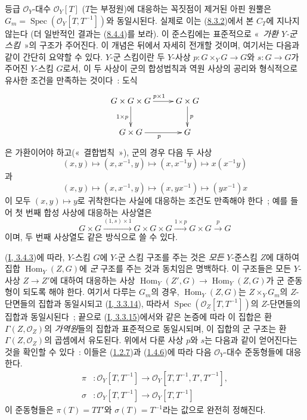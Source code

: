 \begin{remark}[8.3.9]
\label{II.8.3.9-ko}
등급 $\mathcal{O}_Y$-대수 $\mathcal{O}_Y[T]$ ($T$는 부정원)에 대응하는
꼭짓점이 제거된 아핀 원뿔은
$G_m=\operatorname{Spec}(\mathcal{O}_Y[T,T^{-1}])$와 동일시된다. 실제로
이는 (\hyperref[II.8.3.2-ko]{8.3.2})에서 본 $C_T$에 지나지 않는다
(더 일반적인 결과는 (\hyperref[II.8.4.4-ko]{8.4.4})를 보라). 이
준스킴에는 표준적으로 «~\emph{가환 $Y$-군 스킴}~»의 구조가 주어진다.
이 개념은 뒤에서 자세히 전개할 것이며, 여기서는 다음과 같이 간단히
요약할 수 있다. $Y$-군 스킴이란 두 $Y$-사상
$p:G\times_YG\to G$와 $s:G\to G$가 주어진 $Y$-스킴 $G$로서, 이 두
사상이 군의 합성법칙과 역원 사상의 공리와 형식적으로 유사한 조건을
만족하는 것이다~: 도식
\[
  \xymatrix{
    G\times G\times G \ar[r]^{p\times1}\ar[d]_{1\times p}
      & G\times G \ar[d]^{p} \\
    G\times G \ar[r]_{p} & G
  }
\]
은 가환이어야 하고(«~결합법칙~»), 군의 경우 다음 두 사상
\[
  (x,y)\mapsto(x,x^{-1},y)\mapsto(x,x^{-1}y)\mapsto x(x^{-1}y)
\]
과
\[
  (x,y)\mapsto(x,x^{-1},y)\mapsto(x,yx^{-1})\mapsto(yx^{-1})x
\]
이 모두 $(x,y)\mapsto y$로 귀착한다는 사실에 대응하는 조건도
만족해야 한다~; 예를 들어 첫 번째 합성 사상에 대응하는 사상열은
\[
  G\times G\xrightarrow{(1,s)\times1}G\times G\times G
  \xrightarrow{1\times p}G\times G\xrightarrow{p}G
\]
이며, 두 번째 사상열도 같은 방식으로 쓸 수 있다.

(\hyperref[I.3.4.3-ko]{I, 3.4.3})에 따라, $Y$-스킴 $G$에 $Y$-군 스킴
구조를 주는 것은 \emph{모든} $Y$-준스킴 $Z$에 대하여 집합
$\operatorname{Hom}_Y(Z,G)$에 \emph{군} 구조를 주는 것과 동치임은
명백하다. 이 구조들은 모든 $Y$-사상 $Z\to Z'$에 대하여 대응하는 사상
$\operatorname{Hom}_Y(Z',G)\to\operatorname{Hom}_Y(Z,G)$가 군 준동형이
되도록 해야 한다. 여기서 다루는 $G_m$의 경우,
$\operatorname{Hom}_Y(Z,G)$는 $Z\times_YG_m$의 $Z$-단면들의 집합과
동일시되고 (\hyperref[I.3.3.14-ko]{I, 3.3.14}), 따라서
$\operatorname{Spec}(\mathcal{O}_Z[T,T^{-1}])$의 $Z$-단면들의 집합과
동일시된다~; 끝으로 (\hyperref[I.3.3.15-ko]{I, 3.3.15})에서와 같은
논증에 따라 이 집합은 환 $\Gamma(Z,\mathcal{O}_Z)$의 \emph{가역원}들의
집합과 표준적으로 동일시되며, 이 집합의 군 구조는 환
$\Gamma(Z,\mathcal{O}_Z)$의 곱셈에서 유도된다. 위에서 다룬 사상 $p$와
$s$는 다음과 같이 얻어진다는 것을 확인할 수 있다~: 이들은
(\hyperref[II.1.2.7-ko]{1.2.7})과
(\hyperref[II.1.4.6-ko]{1.4.6})에 따라 다음 $\mathcal{O}_Y$-대수
준동형들에 대응한다.
\begin{align*}
  \pi &: \mathcal{O}_Y[T,T^{-1}]
  \to\mathcal{O}_Y[T,T^{-1},T',T'^{-1}],\\
  \sigma &: \mathcal{O}_Y[T,T^{-1}]\to\mathcal{O}_Y[T,T^{-1}]
\end{align*}
이 준동형들은 $\pi(T)=TT'$와 $\sigma(T)=T^{-1}$라는 값으로 완전히
정해진다.


\end{remark}
